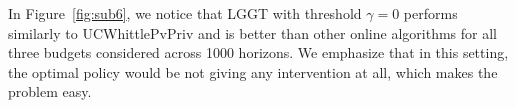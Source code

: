 In Figure~\ref{fig:sub6}, we notice that LGGT with threshold $\gamma=0$ performs similarly to UCWhittlePvPriv and is better than other online algorithms for all three budgets considered across 1000 horizons. We emphasize that in this setting, the optimal policy would be not giving any intervention at all, which makes the problem easy.
